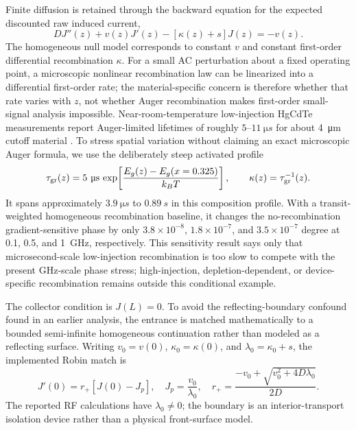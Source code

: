 \documentclass[11pt]{article}
\begin{document}
Finite diffusion is retained through the backward equation for the expected discounted raw induced current,
\begin{equation}
\boxed{
D J''(z)+v(z)J'(z)-[\kappa(z)+s]J(z)=-v(z).}
\label{eq:hgbvp}
\end{equation}
The homogeneous null model corresponds to constant $v$ and constant first-order differential recombination $\kappa$. For a small AC perturbation about a fixed operating point, a microscopic nonlinear recombination law can be linearized into a differential first-order rate; the material-specific concern is therefore whether that rate varies with $z$, not whether Auger recombination makes first-order small-signal analysis impossible. Near-room-temperature low-injection HgCdTe measurements report Auger-limited lifetimes of roughly $5$--$11~\si{\micro s}$ for about \SI{4}{\micro\meter} cutoff material \cite{Kopytko2021}. To stress spatial variation without claiming an exact microscopic Auger formula, we use the deliberately steep activated profile
\begin{equation}
\tau_{\rm gr}(z)=5~\si{\micro s}\,\exp\!\left[\frac{E_g(z)-E_g(x=0.325)}{k_BT}\right],\qquad \kappa(z)=\tau_{\rm gr}^{-1}(z).
\label{eq:hg_graded_kappa}
\end{equation}
It spans approximately $3.9~\si{\micro s}$ to $0.89~\si{s}$ in this composition profile. With a transit-weighted homogeneous recombination baseline, it changes the no-recombination gradient-sensitive phase by only $3.8\times10^{-8}$, $1.8\times10^{-7}$, and $3.5\times10^{-7}$ degree at 0.1, 0.5, and \SI{1}{GHz}, respectively. This sensitivity result says only that microsecond-scale low-injection recombination is too slow to compete with the present GHz-scale phase stress; high-injection, depletion-dependent, or device-specific recombination remains outside this conditional example.

The collector condition is $J(L)=0$. To avoid the reflecting-boundary confound found in an earlier analysis, the entrance is matched mathematically to a bounded semi-infinite homogeneous continuation rather than modeled as a reflecting surface. Writing $v_0=v(0)$, $\kappa_0=\kappa(0)$, and $\lambda_0=\kappa_0+s$, the implemented Robin match is
\begin{equation}
\boxed{J'(0)=r_+[J(0)-J_p],\quad J_p=\frac{v_0}{\lambda_0},\quad r_+=\frac{-v_0+\sqrt{v_0^2+4D\lambda_0}}{2D}.}
\label{eq:hg_robin}
\end{equation}
The reported RF calculations have $\lambda_0\neq0$; the boundary is an interior-transport isolation device rather than a physical front-surface model.
\end{document}
